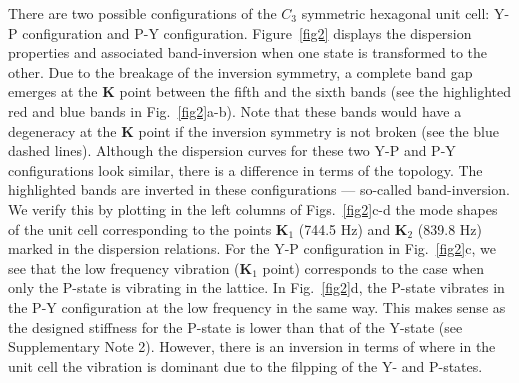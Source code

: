 \documentclass[aps,preprint,onecolumn,showpacs,superscriptaddress,groupedaddress]{revtex4}  %
\begin{document}
There are two possible configurations of the $C_3$ symmetric hexagonal unit cell: Y-P configuration and P-Y configuration. Figure~\ref{fig2} displays the dispersion properties and associated band-inversion when one state is transformed to the other. Due to the breakage of the inversion symmetry, a complete band gap emerges at the \textbf{K} point between the fifth and the sixth bands (see the highlighted red and blue bands in Fig.~\ref{fig2}a-b). Note that these bands would have a degeneracy at the \textbf{K} point if the inversion symmetry is not broken (see the blue dashed lines). Although the dispersion curves for these two Y-P and P-Y configurations look similar, there is a difference in terms of the topology. The highlighted bands are inverted in these configurations --- so-called band-inversion. We verify this by plotting in the left columns of Figs.~\ref{fig2}c-d the mode shapes of the unit cell corresponding to the points \textbf{K$_1$} (744.5 Hz) and \textbf{K$_2$} (839.8 Hz) marked in the dispersion relations. For the Y-P configuration in Fig.~\ref{fig2}c, we see that the low frequency vibration (\textbf{K$_1$} point) corresponds to the case when only the P-state is vibrating in the lattice. In Fig.~\ref{fig2}d, the P-state vibrates in the P-Y configuration at the low frequency in the same way. This makes sense as the designed stiffness for the P-state is lower than that of the Y-state (see Supplementary Note 2). However, there is an inversion in terms of where in the unit cell the vibration is dominant due to the filpping of the Y- and P-states.  
\end{document}
